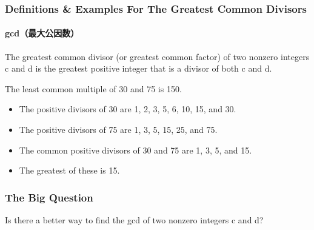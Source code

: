 \documentclass[
	11pt, %
]{beamer}
\begin{document}

\begin{frame}
	\frametitle{Definitions \& Examples For The Greatest Common Divisors}
	\framesubtitle{gcd（最大公因数）}
	
	\begin{definition}
	The greatest common divisor (or greatest common factor) of two
nonzero integers c and d is the greatest \alert{positive} integer that is a divisor of
both c and d.
	\end{definition}
	
	\smallskip %
	
	\begin{example}
	The least common multiple of 30 and 75 is 150.
		\begin{itemize}
			\item The positive divisors of 30 are 1, 2, 3, 5, 6, 10, 15, and 30.
			\item The positive divisors of 75 are 1, 3, 5, 15, 25, and 75.
			\item The common positive divisors of 30 and 75 are 1, 3, 5, and 15.
			\item The greatest of these is 15.
		\end{itemize}
	\end{example}
\end{frame}


\begin{frame}
	\frametitle{The Big Question}
	\bigskip
	{\LARGE Is there a better way to find the gcd of two nonzero integers c and d?}
	\bigskip
\end{frame}

\end{document}
